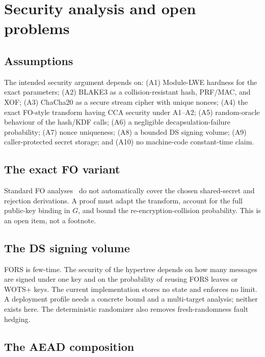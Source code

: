 \documentclass[runningheads]{llncs}
\begin{document}
\section{Security analysis and open problems}
\label{sec:security}

\subsection{Assumptions}

The intended security argument depends on: (A1) Module-LWE hardness for
the exact parameters; (A2) BLAKE3 as a collision-resistant hash,
PRF/MAC, and XOF; (A3) ChaCha20 as a secure stream cipher with unique
nonces; (A4) the exact FO-style transform having CCA security under
A1--A2; (A5) random-oracle behaviour of the hash/KDF calls; (A6) a
negligible decapsulation-failure probability; (A7) nonce uniqueness;
(A8) a bounded DS signing volume; (A9) caller-protected secret storage;
and (A10) no machine-code constant-time claim.

\subsection{The exact FO variant}

Standard FO analyses~\cite{fo99,hhk17} do not automatically cover the
chosen shared-secret and rejection derivations.  A proof must adapt the
transform, account for the full public-key binding in $G$, and bound
the re-encryption-collision probability.  This is an open item, not a
footnote.

\subsection{The DS signing volume}

FORS is few-time.  The security of the hypertree depends on how many
messages are signed under one key and on the probability of reusing
FORS leaves or WOTS+ keys.  The current implementation stores no state
and enforces no limit.  A deployment profile needs a concrete bound and
a multi-target analysis; neither exists here.  The deterministic
randomizer also removes fresh-randomness fault hedging.

\subsection{The AEAD composition}
\end{document}

